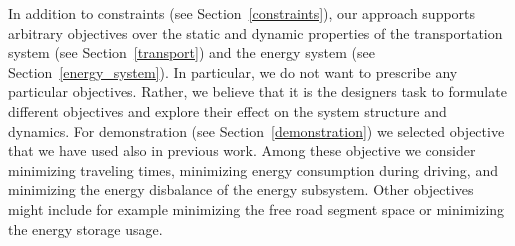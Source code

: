 In addition to constraints (see Section~\ref{constraints}), our approach supports arbitrary objectives over the static and dynamic properties of the transportation system (see Section~\ref{transport}) and the energy system (see Section~\ref{energy_system}). In particular, we do not want to prescribe any particular objectives. Rather, we believe that it is the designers task to formulate different objectives and explore their effect on the system structure and dynamics. For demonstration (see Section~\ref{demonstration}) we selected objective that we have used also in previous work. Among these objective we consider minimizing traveling times, minimizing energy consumption during driving, and minimizing the energy disbalance of the energy subsystem. Other objectives might include for example minimizing the free road segment space or minimizing the energy storage usage.